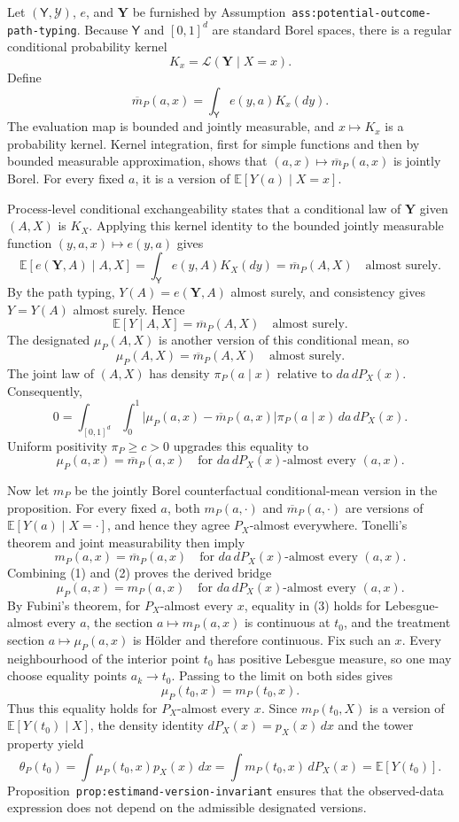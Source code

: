 Let \((\mathsf Y,\mathcal Y)\), \(e\), and \(\mathbf Y\) be furnished by Assumption~\texttt{ass:potential-outcome-path-typing}. Because \(\mathsf Y\) and \([0,1]^d\) are standard Borel spaces, there is a regular conditional probability kernel
\[
K_x=\mathcal L(\mathbf Y\mid X=x).
\]
Define
\[
\overline m_P(a,x)=\int_{\mathsf Y}e(y,a)K_x(dy).
\]
The evaluation map is bounded and jointly measurable, and \(x\mapsto K_x\) is a probability kernel. Kernel integration, first for simple functions and then by bounded measurable approximation, shows that \((a,x)\mapsto\overline m_P(a,x)\) is jointly Borel. For every fixed \(a\), it is a version of \(\mathbb E[Y(a)\mid X=x]\).

Process-level conditional exchangeability states that a conditional law of \(\mathbf Y\) given \((A,X)\) is \(K_X\). Applying this kernel identity to the bounded jointly measurable function \((y,a,x)\mapsto e(y,a)\) gives
\[
\mathbb E[e(\mathbf Y,A)\mid A,X]
=\int_{\mathsf Y}e(y,A)K_X(dy)
=\overline m_P(A,X)
\quad\text{almost surely}.
\]
By the path typing, \(Y(A)=e(\mathbf Y,A)\) almost surely, and consistency gives \(Y=Y(A)\) almost surely. Hence
\[
\mathbb E[Y\mid A,X]=\overline m_P(A,X)
\quad\text{almost surely}.
\]
The designated \(\mu_P(A,X)\) is another version of this conditional mean, so
\[
\mu_P(A,X)=\overline m_P(A,X)
\quad\text{almost surely}.
\]
The joint law of \((A,X)\) has density \(\pi_P(a\mid x)\) relative to \(da\,dP_X(x)\). Consequently,
\[
0=\int_{[0,1]^d}\int_0^1
\lvert\mu_P(a,x)-\overline m_P(a,x)\rvert
\pi_P(a\mid x)\,da\,dP_X(x).
\]
Uniform positivity \(\pi_P\ge c>0\) upgrades this equality to
\[
\mu_P(a,x)=\overline m_P(a,x)
\quad\text{for }da\,dP_X(x)\text{-almost every }(a,x). \tag{1}
\]

Now let \(m_P\) be the jointly Borel counterfactual conditional-mean version in the proposition. For every fixed \(a\), both \(m_P(a,\cdot)\) and \(\overline m_P(a,\cdot)\) are versions of \(\mathbb E[Y(a)\mid X=\cdot]\), and hence they agree \(P_X\)-almost everywhere. Tonelli's theorem and joint measurability then imply
\[
m_P(a,x)=\overline m_P(a,x)
\quad\text{for }da\,dP_X(x)\text{-almost every }(a,x). \tag{2}
\]
Combining (1) and (2) proves the derived bridge
\[
\mu_P(a,x)=m_P(a,x)
\quad\text{for }da\,dP_X(x)\text{-almost every }(a,x). \tag{3}
\]
By Fubini's theorem, for \(P_X\)-almost every \(x\), equality in (3) holds for Lebesgue-almost every \(a\), the section \(a\mapsto m_P(a,x)\) is continuous at \(t_0\), and the treatment section \(a\mapsto\mu_P(a,x)\) is Hölder and therefore continuous. Fix such an \(x\). Every neighbourhood of the interior point \(t_0\) has positive Lebesgue measure, so one may choose equality points \(a_k\to t_0\). Passing to the limit on both sides gives
\[
\mu_P(t_0,x)=m_P(t_0,x).
\]
Thus this equality holds for \(P_X\)-almost every \(x\). Since \(m_P(t_0,X)\) is a version of \(\mathbb E[Y(t_0)\mid X]\), the density identity \(dP_X(x)=p_X(x)\,dx\) and the tower property yield
\[
\theta_P(t_0)
=\int\mu_P(t_0,x)p_X(x)\,dx
=\int m_P(t_0,x)\,dP_X(x)
=\mathbb E[Y(t_0)].
\]
Proposition~\texttt{prop:estimand-version-invariant} ensures that the observed-data expression does not depend on the admissible designated versions.

